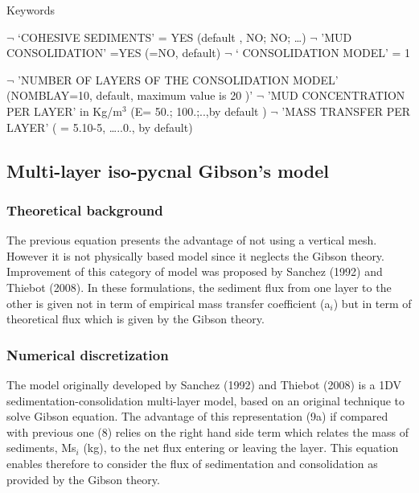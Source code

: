 Keywords

$\neg$\hspace{5mm} `COHESIVE SEDIMENTS' = YES (default , NO; NO; \dots )%
\newline
$\neg$\hspace{5mm} 'MUD CONSOLIDATION' =YES (=NO, default) \newline
$\neg$\hspace{5mm} ` CONSOLIDATION MODEL' = 1

$\neg$\hspace{5mm} 'NUMBER OF LAYERS OF THE CONSOLIDATION MODEL'
(NOMBLAY=10, default, maximum value is 20 )'\newline
$\neg$\hspace{5mm} 'MUD CONCENTRATION PER LAYER' in Kg/m$^{3}$ (E= 50.;
100.;..,by default )\newline
$\neg$\hspace{5mm} 'MASS TRANSFER PER LAYER' ( = 5.10-5, \dots ..0., by
default)

\subsection{Multi-layer iso-pycnal Gibson's model}

\subsubsection{Theoretical background}

The previous equation presents the advantage of not using a vertical mesh.
However it is not physically based model since it neglects the Gibson
theory. Improvement of this category of model was proposed by Sanchez (1992)
and Thiebot (2008). In these formulations, the sediment flux from one layer
to the other is given not in term of empirical mass transfer coefficient (a$%
_{i}$) but in term of theoretical flux which is given by the Gibson theory.

\subsubsection{Numerical discretization}

\hspace{5mm} The model originally developed by Sanchez (1992) and Thiebot
(2008) is a 1DV sedimentation-consolidation {\guillemotleft }{\nobreakspace}%
multi-layer{\nobreakspace}{\guillemotright } model, based on an original
technique to solve Gibson equation. The advantage of this representation
(9a) if compared with previous one (8) relies on the right hand side term
which relates the mass of sediments, Ms$_{i}$ (kg), to the net flux entering
or leaving the layer. This equation enables therefore to consider the flux
of sedimentation and consolidation as provided by the Gibson theory.

